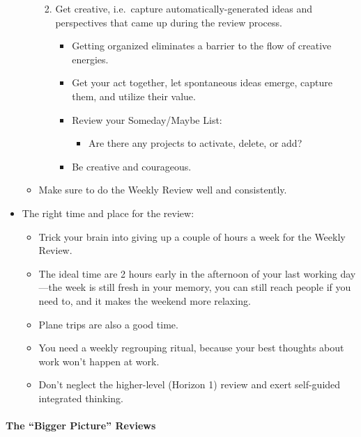 \documentclass{article}
\begin{document}
\begin{itemize}
\begin{itemize}
\begin{enumerate}
\begin{itemize}
        \end{itemize}
        \item Get creative, i.e.\  capture automatically-generated ideas and perspectives that came up during the review process.
        \begin{itemize}
          \item Getting organized eliminates a barrier to the flow of creative energies.
          \item Get your act together, let spontaneous ideas emerge, capture them, and utilize their value.
          \item Review your Someday/Maybe List:
          \begin{itemize}
            \item Are there any projects to activate, delete, or add?
          \end{itemize}
          \item Be creative and courageous.
        \end{itemize}
    \end{enumerate}
    \item Make sure to do the Weekly Review well and consistently.
  \end{itemize}
  \item The right time and place for the review:
  \begin{itemize}
    \item Trick your brain into giving up a couple of hours a week for the Weekly Review.
    \item The ideal time are 2 hours early in the afternoon of your last working day---the week is still fresh in your memory, you can still reach people if you need to, and it makes the weekend more relaxing.
    \item Plane trips are also a good time.
    \item You need a weekly regrouping ritual, because your best thoughts about work won't happen at work.
    \item Don't neglect the higher-level (Horizon 1) review and exert self-guided integrated thinking.
  \end{itemize}
\end{itemize}

\paragraph{The ``Bigger Picture'' Reviews}
\end{document}
